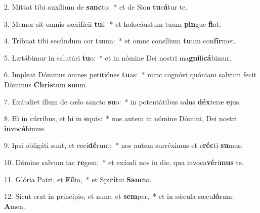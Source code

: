 2. Mittat tibi auxílium de \textbf{sanc}to:~*  et de Sion \textbf{tu}e\textbf{á}tur te.\

3. Memor sit omnis sacrifícii \textbf{tu}i:~*  et holocáustum tuum \textbf{pin}gue \textbf{fi}at.\

4. Tríbuat tibi secúndum cor \textbf{tu}um:~*  et omne consílium \textbf{tu}um con\textbf{fír}met.\

5. Lætábimur in salutári \textbf{tu}o:~*  et in nómine Dei nostri ma\textbf{gni}fi\textbf{cá}bimur.\

6. Impleat Dóminus omnes petitiónes \textbf{tu}as:~*  nunc cognóvi quóniam salvum fecit Dóminus \textbf{Chris}tum \textbf{su}um.\

7. Exáudiet illum de cælo sancto \textbf{su}o:~*  in potentátibus salus \textbf{déx}teræ \textbf{e}jus.\

8. Hi in cúrribus, et hi in \textbf{e}quis:~*  nos autem in nómine Dómini, Dei nostri \textbf{in}vo\textbf{cá}bimus.\

9. Ipsi obligáti sunt, et ceci\textbf{dé}runt:~*  nos autem surréximus et e\textbf{réc}ti \textbf{su}mus.\

10. Dómine salvum fac \textbf{re}gem:~*  et exáudi nos in die, qua invoca\textbf{vé}ri\textbf{mus} te.\

11. Glória Patri, et \textbf{Fí}lio,~*  et Spi\textbf{rí}tui \textbf{Sanc}to.\

12. Sicut erat in princípio, et nunc, et \textbf{sem}per,~*  et in sǽcula sæcu\textbf{ló}rum. \textbf{A}men.\

